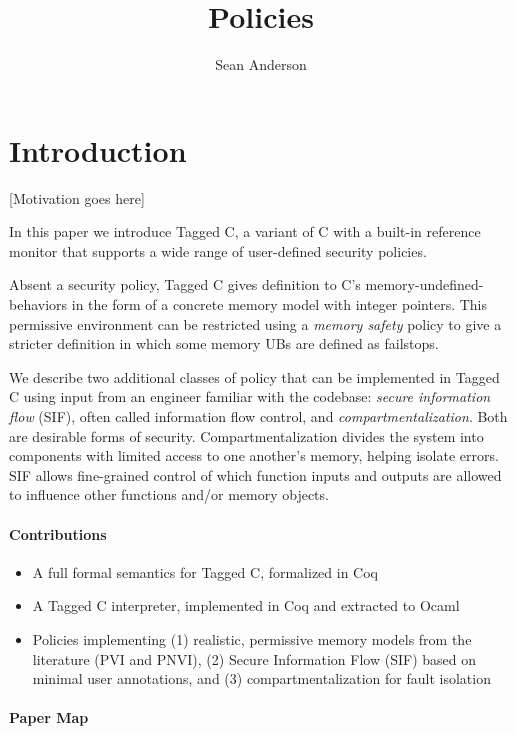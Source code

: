 \documentclass[acmsmall,review,anonymous]{acmart}\settopmatter{printfolios=true,printccs=false,printacmref=false}
\title{Policies}
\author{Sean Anderson}
\affiliation{
  \department{Computer Science}
  \institution{Portland State University}
}
\begin{document}
\maketitle




\section{Introduction}

[Motivation goes here]

In this paper we introduce Tagged C, a variant of C with a built-in reference monitor that
supports a wide range of user-defined security policies.

Absent a security policy, Tagged C
gives definition to C's memory-undefined-behaviors in the form of a concrete memory model
with integer pointers. This permissive environment can be restricted using a {\it memory safety}
policy to give a stricter definition in which some memory UBs are defined as failstops.

We describe two additional classes of policy that can be implemented in Tagged C using input from
an engineer familiar with the codebase: {\em secure information flow} (SIF), often called
information flow control, and {\em compartmentalization}. Both are desirable forms of security.
Compartmentalization divides the system into components with limited access to one another's
memory, helping isolate errors. SIF allows fine-grained control of which function inputs and
outputs are allowed to influence other functions and/or memory objects.

\paragraph{Contributions}

\begin{itemize}
\item A full formal semantics for Tagged C, formalized in Coq
\item A Tagged C interpreter, implemented in Coq and extracted to Ocaml
\item Policies implementing (1) realistic, permissive memory models from the literature (PVI and PNVI),
  (2) Secure Information Flow (SIF) based on minimal user annotations, and (3) compartmentalization
  for fault isolation
\end{itemize}

\paragraph{Paper Map}
\end{document}
